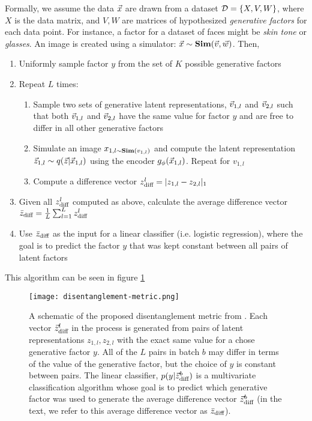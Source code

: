 Formally, we assume the data $\vec{x}$ are drawn from a dataset $\mathcal{D}=\{X, V, W\}$, where $X$ is the data matrix, and $V, W$ are matrices of hypothesized {\it generative factors} for each data point. For instance, a factor for a dataset of faces might be {\it skin tone} or {\it glasses}. An image is created using a simulator: $\vec{x}\sim\mathbf{Sim}(\vec{v}, \vec{w})$. Then,
\begin{enumerate}
    \item Uniformly sample factor $y$ from the set of $K$ possible generative factors
    \item Repeat $L$ times:
    \begin{enumerate}
        \item Sample two sets of generative latent representations, $\vec{v}_{1,l}$ and $\vec{v}_{2,l}$ such that both $\vec{v}_{1,l}$ and $\vec{v}_{2,l}$ have the same value for factor $y$ and are free to differ in all other generative factors
        \item Simulate an image $x_{1,l\sim\mathbf{Sim}(v_{1,l})}$ and compute the latent representation $\vec{z}_{1,l}\sim q(\vec{z}|\vec{x}_{1,l})$ using the encoder $g_\phi(\vec{x}_{1,l})$. Repeat for $v_{1,l}$
        \item Compute a difference vector $z^l_{\text{diff}}=|z_{1,l}-z_{2,l}|_1$
    \end{enumerate}
    \item Given all $z^l_{\text{diff}}$ computed as above, calculate the average difference vector $\bar{z}_{\text{diff}} = \frac{1}{L}\sum_{l=1}^Lz^l_{\text{diff}}$
    \item Use $\bar{z}_{\text{diff}}$ as the input for a linear classifier (i.e. logistic regression), where the goal is to predict the factor $y$ that was kept constant between all pairs of latent factors
\end{enumerate}

This algorithm can be seen in figure \ref{fig:disentanglement-metric}

\begin{figure}
    \texttt{[image: disentanglement-metric.png]}
    \caption{A schematic of the proposed disentanglement metric from \cite{higgins2016beta}. Each vector $\vec{z}^l_{\text{diff}}$ in the process is generated from pairs of latent representations $z_{1,l}, z_{2,l}$ with the exact same value for a chose generative factor $y$. All of the $L$ pairs in batch $b$ may differ in terms of the value of the generative factor, but the choice of $y$ is constant between pairs. The linear classifier, $p(y|\vec{z}^b_{\text{diff}})$ is a multivariate classification algorithm whose goal is to predict which generative factor was used to generate the average difference vector $\vec{z}_{\text{diff}}^b$ (in the text, we refer to this average difference vector as $\bar{z}_{\text{diff}}$).}
    \label{fig:disentanglement-metric}
\end{figure}

